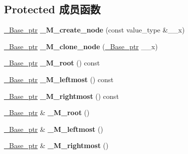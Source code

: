 \subsection*{Protected 成员函数}
\begin{DoxyCompactItemize}
\item 
\mbox{\label{class___rb__tree_a321754e498b278d9aec3693c0e77bbb9}} 
\hyperlink{struct___rb__tree__node__base}{\+\_\+\+Base\+\_\+ptr} {\bfseries \+\_\+\+M\+\_\+create\+\_\+node} (const value\+\_\+type \&\+\_\+\+\_\+x)
\item 
\mbox{\label{class___rb__tree_a28da4f9f35a1547134263da2be5594c7}} 
\hyperlink{struct___rb__tree__node__base}{\+\_\+\+Base\+\_\+ptr} {\bfseries \+\_\+\+M\+\_\+clone\+\_\+node} (\hyperlink{struct___rb__tree__node__base}{\+\_\+\+Base\+\_\+ptr} \+\_\+\+\_\+x)
\item 
\mbox{\label{class___rb__tree_acee983c6dfe62a827d5ed7b9f78fdd91}} 
\hyperlink{struct___rb__tree__node__base}{\+\_\+\+Base\+\_\+ptr} {\bfseries \+\_\+\+M\+\_\+root} () const
\item 
\mbox{\label{class___rb__tree_a16268b5676f61fa679d768e0d169f846}} 
\hyperlink{struct___rb__tree__node__base}{\+\_\+\+Base\+\_\+ptr} {\bfseries \+\_\+\+M\+\_\+leftmost} () const
\item 
\mbox{\label{class___rb__tree_a1792c23fb0134e5f718cc2d878083e8a}} 
\hyperlink{struct___rb__tree__node__base}{\+\_\+\+Base\+\_\+ptr} {\bfseries \+\_\+\+M\+\_\+rightmost} () const
\item 
\mbox{\label{class___rb__tree_a9e75f574a3b84725f770825f3ecd0a73}} 
\hyperlink{struct___rb__tree__node__base}{\+\_\+\+Base\+\_\+ptr} \& {\bfseries \+\_\+\+M\+\_\+root} ()
\item 
\mbox{\label{class___rb__tree_aeb3d336122025845a7b44192b259e79b}} 
\hyperlink{struct___rb__tree__node__base}{\+\_\+\+Base\+\_\+ptr} \& {\bfseries \+\_\+\+M\+\_\+leftmost} ()
\item 
\mbox{\label{class___rb__tree_af11ada548038f718168cdbdbc763d9c0}} 
\hyperlink{struct___rb__tree__node__base}{\+\_\+\+Base\+\_\+ptr} \& {\bfseries \+\_\+\+M\+\_\+rightmost} ()
\end{DoxyCompactItemize}

